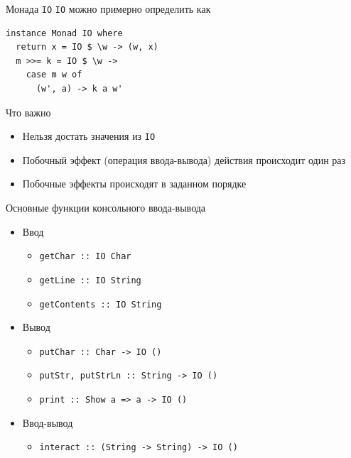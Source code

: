 \documentclass{beamer}
\newcommand{\hs}[1]{\texttt{#1}}
\begin{document}
  \begin{frame}[fragile]{Монада \texttt{IO}}
    \hs{IO} можно примерно определить как

\begin{verbatim}
instance Monad IO where
  return x = IO $ \w -> (w, x)
  m >>= k = IO $ \w ->
    case m w of
      (w', a) -> k a w'
\end{verbatim}

\begin{block}{Что важно}
    \begin{itemize}
        \item Нельзя достать значения из \hs{IO}
        \item Побочный эффект (операция ввода-вывода) действия происходит один раз
        \item Побочные эффекты происходят в заданном порядке
    \end{itemize}
\end{block}
  \end{frame}
\begin{frame}{Основные функции консольного ввода-вывода}
    \begin{itemize}
        \item Ввод
        \begin{itemize}
            \item \hs{getChar :: IO Char}
            \item \hs{getLine :: IO String}
            \item \hs{getContents :: IO String}
        \end{itemize}
    \item Вывод
    \begin{itemize}
        \item \hs{putChar :: Char -> IO ()}
        \item \hs{putStr, putStrLn :: String -> IO ()}
        \item \hs{print :: Show a => a -> IO ()}
    \end{itemize}
    \item Ввод-вывод
    \begin{itemize}
        \item \hs{interact :: (String -> String) -> IO ()}
    \end{itemize}
    \end{itemize}
\end{frame}
\end{document}

